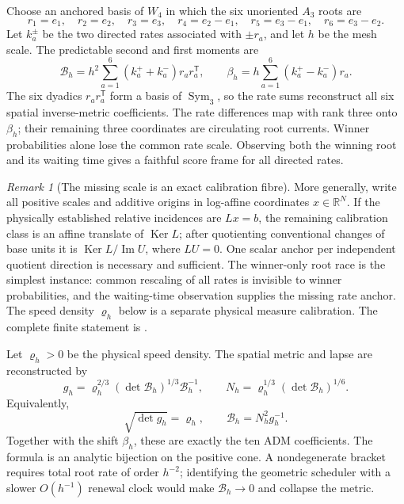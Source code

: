 \documentclass[11pt]{article}
\theoremstyle{definition}
\theoremstyle{remark}
\newtheorem{remark}[remark]{Remark}
\newcommand{\Ker}{\operatorname{Ker}}
\newcommand{\Sym}{\operatorname{Sym}}
\begin{document}
Choose an anchored basis of $W_4$ in which the six unoriented $A_3$ roots are
\begin{equation}
 r_1=e_1,\quad r_2=e_2,\quad r_3=e_3,\quad
 r_4=e_2-e_1,\quad r_5=e_3-e_1,\quad r_6=e_3-e_2.
 \label{eq:a3-roots-main}
\end{equation}
Let $k_a^\pm$ be the two directed rates associated with $\pm r_a$, and let $h$
be the mesh scale.  The predictable second and first moments are
\begin{equation}
 \mathcal B_h
 =h^2\sum_{a=1}^{6}(k_a^++k_a^-)r_ar_a^{\mathsf T},
 \qquad
 \beta_h
 =h\sum_{a=1}^{6}(k_a^+-k_a^-)r_a.
 \label{eq:bracket-drift-main}
\end{equation}
The six dyadics $r_ar_a^{\mathsf T}$ form a basis of $\Sym_3$, so the rate sums
reconstruct all six spatial inverse-metric coefficients.  The rate differences
map with rank three onto $\beta_h$; their remaining three coordinates are
circulating root currents.  Winner probabilities alone lose the common rate
scale.  Observing both the winning root and its waiting time gives a faithful
score frame for all directed rates.

\begin{remark}[The missing scale is an exact calibration fibre]
\label{rem:main-calibration-fibre}
More generally, write all positive scales and additive origins in log-affine
coordinates $x\in\mathbb R^N$.  If the physically established relative
incidences are $Lx=b$, the remaining calibration class is an affine translate
of $\Ker L$; after quotienting conventional changes of base units it is
$\Ker L/\operatorname{Im}U$, where $LU=0$.  One scalar anchor per independent
quotient direction is necessary and sufficient.  The winner-only root race is
the simplest instance: common rescaling of all rates is invisible to winner
probabilities, and the waiting-time observation supplies the missing rate
anchor.  The speed density $\varrho_h$ below is a separate physical measure
calibration.  The complete finite statement is
.
\end{remark}

Let $\varrho_h>0$ be the physical speed density.  The spatial metric and lapse
are reconstructed by
\begin{equation}
 \boxed{
 g_h=\varrho_h^{2/3}(\det\mathcal B_h)^{1/3}\mathcal B_h^{-1},
 \qquad
 N_h=\varrho_h^{1/3}(\det\mathcal B_h)^{1/6}.}
 \label{eq:adm-inversion-main}
\end{equation}
Equivalently,
\begin{equation}
 \sqrt{\det g_h}=\varrho_h,
 \qquad
 \mathcal B_h=N_h^2g_h^{-1}.
 \label{eq:adm-forward-main}
\end{equation}
Together with the shift $\beta_h$, these are exactly the ten ADM coefficients.
The formula is an analytic bijection on the positive cone.  A nondegenerate
bracket requires total root rate of order $h^{-2}$; identifying the geometric
scheduler with a slower $O(h^{-1})$ renewal clock would make
$\mathcal B_h\to0$ and collapse the metric.
\end{document}

